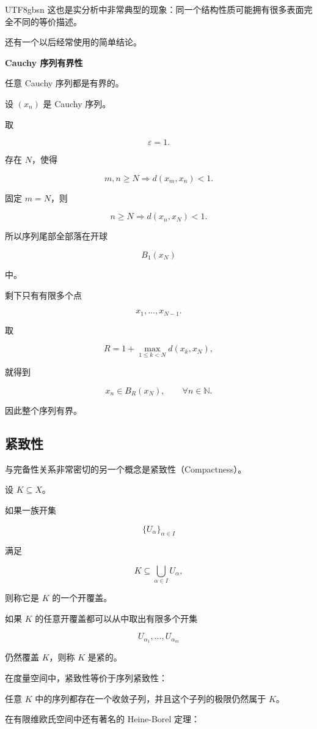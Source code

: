 \documentclass[11pt]{article}
\begin{document}
\begin{CJK*}{UTF8}{gbsn}
这也是实分析中非常典型的现象：同一个结构性质可能拥有很多表面完全不同的等价描述。

还有一个以后经常使用的简单结论。

\textbf{Cauchy 序列有界性}

任意 Cauchy 序列都是有界的。

设 $(x_{n})$ 是 Cauchy 序列。

取

\[
\varepsilon=1.
\]

存在 $N$，使得

\[
m,n\geq N\Longrightarrow d(x_{m},x_{n})<1.
\]

固定 $m=N$，则

\[
n\geq N\Longrightarrow d(x_{n},x_{N})<1.
\]

所以序列尾部全部落在开球

\[
B_{1}(x_{N})
\]

中。

剩下只有有限多个点

\[
x_{1},\ldots,x_{N-1}.
\]

取

\[
R=1+\max_{1\leq k<N}d(x_{k},x_{N}),
\]

就得到

\[
x_{n}\in B_{R}(x_{N}),\qquad\forall n\in\mathbb{N}.
\]

因此整个序列有界。

\subsection{紧致性}

与完备性关系非常密切的另一个概念是紧致性（Compactness）。

设 $K\subseteq X$。

如果一族开集

\[
\{U_{\alpha}\}_{\alpha\in I}
\]

满足

\[
K\subseteq\bigcup_{\alpha\in I}U_{\alpha},
\]

则称它是 $K$ 的一个开覆盖。

如果 $K$ 的任意开覆盖都可以从中取出有限多个开集

\[
U_{\alpha_{1}},\ldots,U_{\alpha_{m}}
\]

仍然覆盖 $K$，则称 $K$ 是紧的。

在度量空间中，紧致性等价于序列紧致性：

任意 $K$ 中的序列都存在一个收敛子列，并且这个子列的极限仍然属于 $K$。

在有限维欧氏空间中还有著名的 Heine-Borel 定理：


\end{CJK*}
\end{document}

